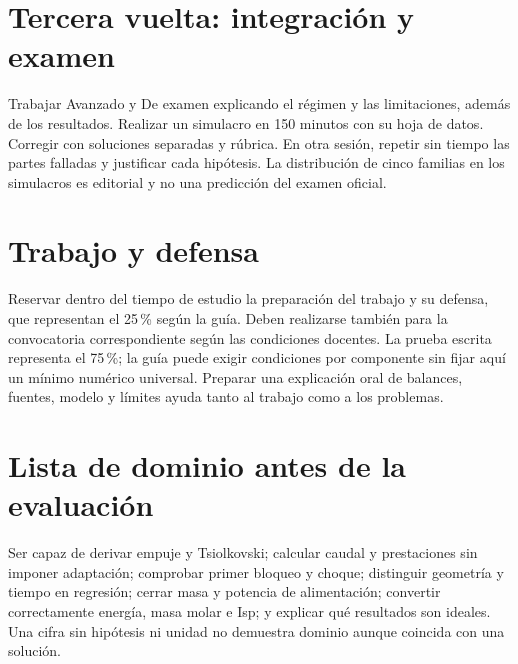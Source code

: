 \section{Tercera vuelta: integración y examen}
Trabajar Avanzado y De examen explicando el régimen y las limitaciones, además de los resultados. Realizar un simulacro en 150 minutos con su hoja de datos. Corregir con soluciones separadas y rúbrica. En otra sesión, repetir sin tiempo las partes falladas y justificar cada hipótesis. La distribución de cinco familias en los simulacros es editorial y no una predicción del examen oficial.
\section{Trabajo y defensa}
Reservar dentro del tiempo de estudio la preparación del trabajo y su defensa, que representan el 25\,\% según la guía. Deben realizarse también para la convocatoria correspondiente según las condiciones docentes. La prueba escrita representa el 75\,\%; la guía puede exigir condiciones por componente sin fijar aquí un mínimo numérico universal. Preparar una explicación oral de balances, fuentes, modelo y límites ayuda tanto al trabajo como a los problemas.
\section{Lista de dominio antes de la evaluación}
Ser capaz de derivar empuje y Tsiolkovski; calcular caudal y prestaciones sin imponer adaptación; comprobar primer bloqueo y choque; distinguir geometría y tiempo en regresión; cerrar masa y potencia de alimentación; convertir correctamente energía, masa molar e Isp; y explicar qué resultados son ideales. Una cifra sin hipótesis ni unidad no demuestra dominio aunque coincida con una solución.
